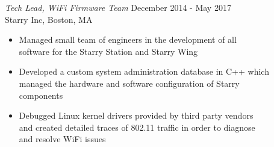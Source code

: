 \documentclass[line,margin]{res}
\begin{document}
\begin{resume}
            {\sl Tech Lead, WiFi Firmware Team} \hfill December 2014 - May 2017 \\
            Starry Inc, Boston, MA
                \begin{itemize} \itemsep -2pt %
                    \item Managed small team of engineers in the development of all \\
                          software for the Starry Station and Starry Wing %
                    \item Developed a custom system administration database in C++ which \\
                          managed the hardware and software configuration of Starry \\
                          components %
                    \item Debugged Linux kernel drivers provided by third party vendors \\
                         and created detailed traces of 802.11 traffic in order to diagnose \\
                         and resolve WiFi issues
                \end{itemize}


\end{resume}
\end{document}
